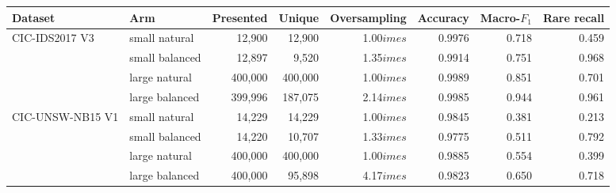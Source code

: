 \begin{tabular}{@{}llrrrrrr@{}}
\toprule
Dataset & Arm & Presented & Unique & Oversampling & Accuracy & Macro-$F_1$ & Rare recall \\
\midrule
CIC-IDS2017 V3 & small natural & 12,900 & 12,900 & 1.00$	imes$ & 0.9976 & 0.718 & 0.459 \\
 & small balanced & 12,897 & 9,520 & 1.35$	imes$ & 0.9914 & 0.751 & 0.968 \\
 & large natural & 400,000 & 400,000 & 1.00$	imes$ & 0.9989 & 0.851 & 0.701 \\
 & large balanced & 399,996 & 187,075 & 2.14$	imes$ & 0.9985 & 0.944 & 0.961 \\
\addlinespace
CIC-UNSW-NB15 V1 & small natural & 14,229 & 14,229 & 1.00$	imes$ & 0.9845 & 0.381 & 0.213 \\
 & small balanced & 14,220 & 10,707 & 1.33$	imes$ & 0.9775 & 0.511 & 0.792 \\
 & large natural & 400,000 & 400,000 & 1.00$	imes$ & 0.9885 & 0.554 & 0.399 \\
 & large balanced & 400,000 & 95,898 & 4.17$	imes$ & 0.9823 & 0.650 & 0.718 \\
\bottomrule
\end{tabular}

